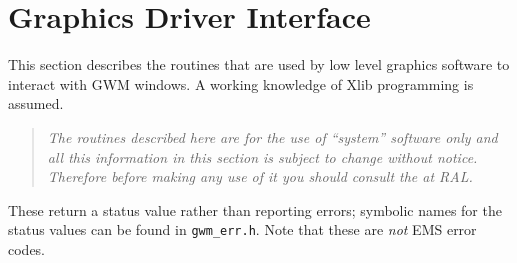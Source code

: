 \documentclass[twoside,11pt,nolof]{starlink}
\begin{document}
\section{Graphics Driver Interface}

This section describes the routines that are used by low level graphics
software to interact with GWM windows. A working knowledge of Xlib
programming is assumed.
\begin{quote}\emph{The routines described here are for the use of ``system'' software only
and all this information in this section is subject to change without
notice. Therefore before making any use of it you should consult the
at RAL.}
\end{quote}
These return a status value rather than reporting errors; symbolic names
for the status values can be found in \texttt{gwm\_err.h}. Note that these are
\emph{not} EMS error codes.
\end{document}
